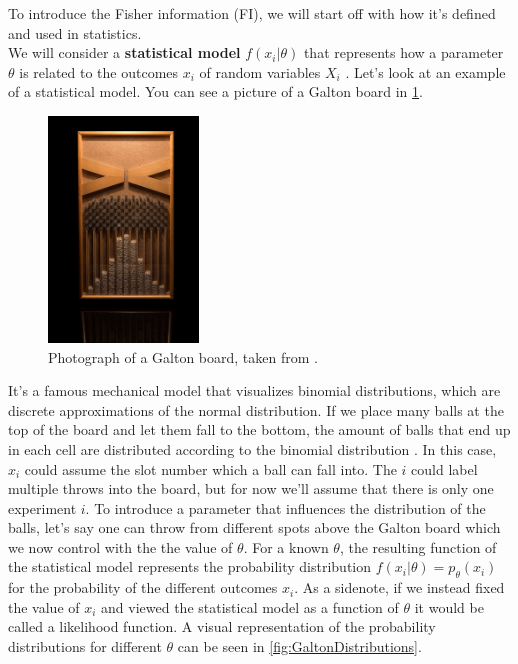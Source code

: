To introduce the Fisher information (FI), we will start off with how it's defined and used in statistics.\\
We will consider a \textbf{statistical model} $f(x_i|\theta)$ that represents how a parameter $\theta$ is related to the outcomes $x_i$ of random variables $X_i$ \cite{StatisticFisherInfoTutorial}. Let's look at an example of a statistical model. You can see a picture of a Galton board in \cref{fig:GaltonPicture}.
\begin{figure}
	\centering
	\includegraphics[width = 4cm]{text/FisherInformation/plots/GaltonBoard.jpg}
	\caption{Photograph of a Galton board, taken from \cite{GaltonBoardPicture}.}
	\label{fig:GaltonPicture}
\end{figure}
It's a famous mechanical model that visualizes binomial distributions, which are discrete approximations of the normal distribution. If we place many balls at the top of the board and let them fall to the bottom, the amount of balls that end up in each cell are distributed according to the binomial distribution \cite{GaltonBoardArticle}. In this case, $x_i$ could assume the slot number which a ball can fall into. The $i$ could label multiple throws into the board, but for now we'll assume that there is only one experiment $i$. To introduce a parameter that influences the distribution of the balls, let's say one can throw from different spots above the Galton board which we now control with the the value of $\theta$. For a known $\theta$, the resulting function of the statistical model represents the probability distribution $f(x_i|\theta) = p_\theta(x_i)$ for the probability of the different outcomes $x_i$. As a sidenote, if we instead fixed the value of $x_i$ and viewed the statistical model as a function of $\theta$ it would be called a likelihood function. A visual representation of the probability distributions for different $\theta$ can be seen in \cref{fig:GaltonDistributions}.
